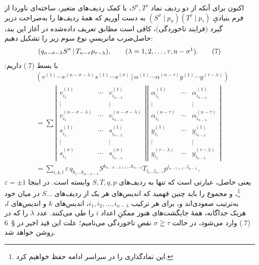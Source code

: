 \documentclass[11pt]{article}
\providecommand{\pair}[2]{(#1\,|\,#2)}
\providecommand{\eps}{\varepsilon}
\begin{document}
اکنون برای آنکه از دو ردیف نماد $S^\sigma,T^\tau$، با کمک ردیف‌های متغیر، ساخته‌ای ناوردا از فرم بنیادیِ $(S^\sigma\mid p_\sigma)(T^\tau\mid p_\tau)$ به دست آوریم که همهٔ ردیف‌ها را به‌صراحت دربر گیرد (فرایند تاخوردگی)، کافی است مطابق تعریف داده‌شده در آغاز این بند، حاصل‌ضرب ماتریسیِ نوع سوم زیر را تشکیل دهیم:
\begin{equation}
 \pair{q_{n-\sigma-\lambda}S^\sigma}{T_{n-\tau}p_{\tau-\lambda}},
 \qquad (\lambda=1,2,\ldots,\tau,n-\sigma\footnotemark).
\tag{7}
\end{equation}
با بسط (7.) داریم:
\begingroup
\setlength{\arraycolsep}{2pt}
\begin{equation}
\begin{aligned}
&\pair{v^{(1)}\cdots v^{(n-\sigma-\lambda)}s^{(1)}\cdots s^{(\sigma)}}
       {\alpha^{(1)}\cdots\alpha^{(n-\tau)}y^{(1)}\cdots y^{(\tau-\lambda)}} \\
&=\sum
\left|\begin{array}{ccc}
 v_{i_1}^{(1)}&\cdots&v_{i_{n-\lambda}}^{(1)}\\
 \vdots&&\vdots\\
 v_{i_1}^{(n-\sigma-\lambda)}&\cdots&v_{i_{n-\lambda}}^{(n-\sigma-\lambda)}\\
 s_{i_1}^{(1)}&\cdots&s_{i_{n-\lambda}}^{(1)}\\
 \vdots&&\vdots\\
 s_{i_1}^{(\sigma)}&\cdots&s_{i_{n-\lambda}}^{(\sigma)}
\end{array}\right|
\left|\begin{array}{ccc}
 \alpha_{i_1}^{(1)}&\cdots&\alpha_{i_{n-\lambda}}^{(1)}\\
 \vdots&&\vdots\\
 \alpha_{i_1}^{(n-\tau)}&\cdots&\alpha_{i_{n-\lambda}}^{(n-\tau)}\\
 y_{i_1}^{(1)}&\cdots&y_{i_{n-\lambda}}^{(1)}\\
 \vdots&&\vdots\\
 y_{i_1}^{(\tau-\lambda)}&\cdots&y_{i_{n-\lambda}}^{(\tau-\lambda)}
\end{array}\right|\\
&=\sum_{i,k,l}\eps\,q_{k_1\ldots k_{n-\sigma-\lambda}}
 S^{k_{n-\sigma-\lambda+1}\ldots k_{n-\lambda}}
 T_{l_1\ldots l_{n-\tau}}
 p^{l_{n-\tau+1}\ldots l_{n-\lambda}},
\end{aligned}
\tag{8}
\end{equation}
\endgroup
یعنی حاصل، عبارتی است که تنها به ردیف‌های $S,T,q,p$ وابسته است. در اینجا $\eps=\pm1$\footnote{این نمادگذاری را در سراسر ادامه حفظ خواهیم کرد.}، و مجموع را باید چنین فهمید که اندیس‌های هر یک از ردیف‌های $S\ldots$ در میان خود به‌ترتیب صعودی‌اند و، برای هر ترکیب $i_1,i_2,\ldots,i_{n-\lambda}$، اندیس‌های $k$ و اندیس‌های $l$، هریک جداگانه، همهٔ جایگشت‌های هنوز ممکنِ اعداد $i$ را طی می‌کنند. عدد $\lambda$ را که در (7.) وارد می‌شود، در حالت $\sigma\geqq\tau$ نقصِ تاخوردگی می‌نامیم؛ علت این قید اخیر در \S\ 6 روشن خواهد شد.
\end{document}
